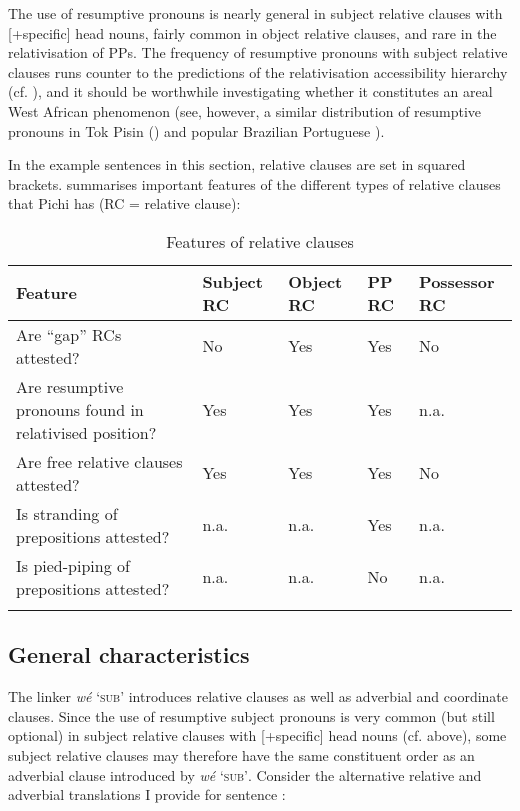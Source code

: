 The use of resumptive pronouns is nearly general in subject relative clauses with [+specific] head nouns, fairly common in object relative clauses, and rare in the relativisation of PPs. The frequency of resumptive pronouns with subject relative clauses runs counter to the predictions of the relativisation accessibility hierarchy (cf. \citealt{KeenanComrie1977}), and it should be worthwhile investigating whether it constitutes an areal West African phenomenon (see, however, a similar distribution of resumptive pronouns in Tok Pisin (\citealt{SankoffBrown1976}) and popular Brazilian Portuguese \citep{Tarallo1983}).


In the example sentences in this section, relative clauses are set in squared brackets.  summarises important features of the different types of relative clauses that Pichi has (RC = relative clause): 


\begin{table}
\caption{Features of relative clauses}
\label{tab:key:10.3}

\begin{tabularx}{\textwidth}{Qllll}
\lsptoprule
Feature & Subject RC & Object RC & PP RC & Possessor RC\\
\midrule 
Are “gap” RCs attested? & No & Yes & Yes & No\\
\tablevspace 
Are resumptive pronouns found in relativised position? & Yes & Yes & Yes & n.a.\\
\tablevspace 
Are free relative clauses attested? & Yes & Yes & Yes & No\\
\tablevspace 
Is stranding of prepositions attested? & n.a. & n.a. & Yes & n.a.\\
\tablevspace 
Is pied-piping of prepositions attested? & n.a. & n.a. & No & n.a.\\
\lspbottomrule
\end{tabularx}
\end{table}
\subsection{General characteristics}\label{sec:10.6.1}

The linker \textit{wé} ‘\textsc{sub}’ introduces relative clauses as well as adverbial and coordinate clauses. Since the use of resumptive subject pronouns is very common (but still optional) in subject relative clauses with [+specific] head nouns (cf.  above), some subject relative clauses may therefore have the same constituent order as an adverbial clause introduced by \textit{wé} ‘\textsc{sub’}. Consider the alternative relative and adverbial translations I provide for sentence :


